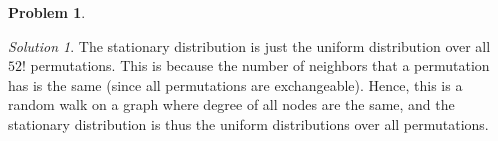 \documentclass[11pt]{article}
\theoremstyle{definition}
\newtheorem{prob}[theo]{\color{Maroon} Problem}
\theoremstyle{remark}
\newtheorem*{soln}{\color{Maroon} Solution}
\begin{document}
\begin{prob}
\begin{enumerate}[label = (\alph*)]
    \begin{soln}
    
    The stationary distribution is just the uniform distribution over all $52!$ permutations. This is because the number of neighbors that a permutation has is the same (since all permutations are exchangeable). Hence, this is a random walk on a graph where degree of all nodes are the same, and the stationary distribution is thus the uniform distributions over all permutations.
    
    \end{soln}
\end{enumerate}

\end{prob}
\end{document}
